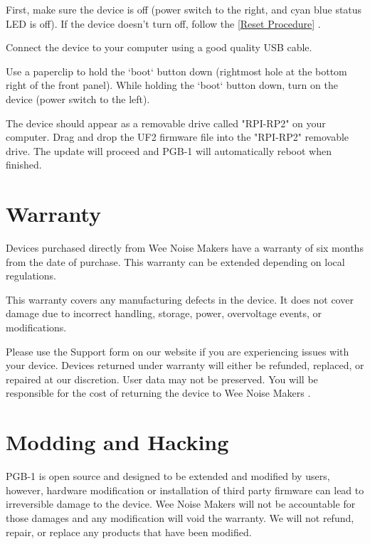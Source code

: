 \documentclass[8pt]{extarticle}
\def\device{PGB-1 }
\def\WNM{Wee Noise Makers }
\newcommand{\reflabel}[2]{
[\hyperref[#1]{#2}]
}
\begin{document}
\begin{multicols*}{3}
First, make sure the device is off (power switch to the right, and cyan blue status LED is off). If the device doesn't turn off, follow the \reflabel{procedures:reset}{Reset Procedure}.

Connect the device to your computer using a good quality USB cable.

Use a paperclip to hold the `boot` button down (rightmost hole at the bottom right of the front panel). While holding the `boot` button down, turn on the device (power switch to the left).

The device should appear as a removable drive called "RPI-RP2" on your computer. Drag and drop the UF2 firmware file into the "RPI-RP2" removable drive. The update will proceed and \device will automatically reboot when finished.
    
\section{Warranty} 

Devices purchased directly from \WNM have a warranty of six months from the date of purchase. This warranty can be extended depending on local regulations.

This warranty covers any manufacturing defects in the device. It does not cover damage due to incorrect handling, storage, power, overvoltage events, or modifications.

Please use the Support form on our website if you are experiencing issues with your device. Devices returned under warranty will either be refunded, replaced, or repaired at our discretion. User data may not be preserved. You will be responsible for the cost of returning the device to \WNM.

\section{Modding and Hacking} 

\device is open source and designed to be extended and modified by users, however, hardware modification or installation of third party firmware can lead to irreversible damage to the device. \WNM will not be accountable for those damages and any modification will void the warranty. We will not refund, repair, or replace any products that have been modified.

\end{multicols*}
\end{document}
